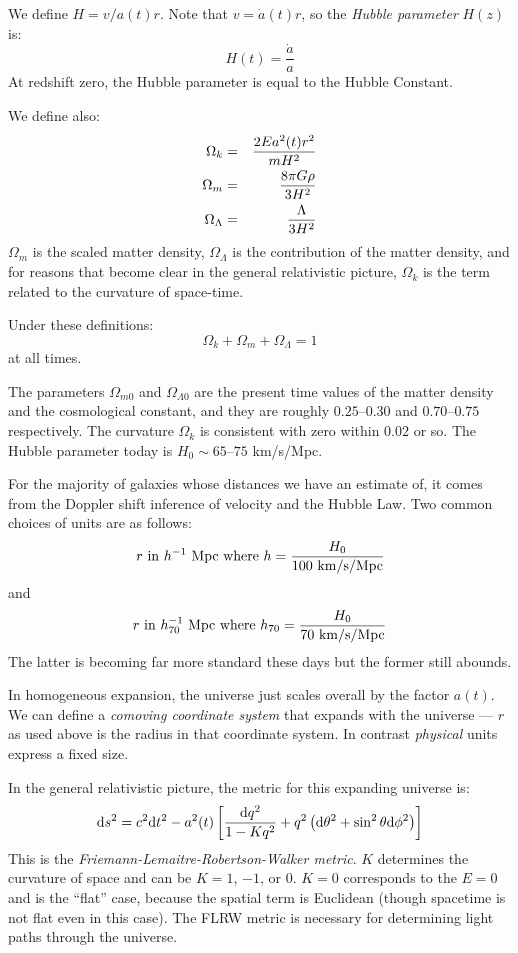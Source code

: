 We define $H=v/a(t)r$. Note that $v={\dot a}(t) r$, so the {\it Hubble
  parameter} $H(z)$ is:
\begin{equation}
  H(t) = \frac{\dot a}{a}
\end{equation}
At redshift zero, the Hubble parameter is equal to the Hubble
Constant.

We define also:
\begin{eqnarray}
\Omega_k &=& \frac{2Ea^2(t) r^2}{mH^2} \cr
\Omega_m &=& \frac{8\pi G\rho}{3H^2}\cr
\Omega_\Lambda &=& \frac{\Lambda}{3H^2} 
\end{eqnarray}
$\Omega_m$ is the scaled matter density, $\Omega_\Lambda$ is the
contribution of the matter density, and for reasons that become clear
in the general relativistic picture, $\Omega_k$ is the term related to
the curvature of space-time.

Under these definitions:
\begin{equation}
\Omega_k + \Omega_m + \Omega_\Lambda = 1
\end{equation}
at all times.
  
The parameters $\Omega_{m0}$ and $\Omega_{\Lambda 0}$ are the present
time values of the matter density and the cosmological constant, and
they are roughly $0.25$--$0.30$ and $0.70$--$0.75$ respectively.  The
curvature $\Omega_k$ is consistent with zero within $0.02$ or so.
The Hubble parameter today is $H_0 \sim 65$--$75$ km/s/Mpc. 

For the majority of galaxies whose distances we have an estimate of,
it comes from the Doppler shift inference of velocity and the Hubble
Law. Two common choices of units are as follows:
\begin{equation}
r {\rm ~in~}h^{-1}{\rm ~Mpc} {\rm ~where~} h = \frac{H_0}{100 {\rm
    ~km/s/Mpc}} 
\end{equation}
and 
\begin{equation}
r {\rm ~in~}h_{70}^{-1}{\rm ~Mpc} {\rm ~where~} h_{70} = \frac{H_0}{70
  {\rm ~km/s/Mpc}}
\end{equation}
The latter is becoming far more standard these days but the former
still abounds.

In homogeneous expansion, the universe just scales overall by the
factor $a(t)$. We can define a {\it comoving coordinate system} that
expands with the universe --- $r$ as used above is the radius in that
coordinate system. In contrast {\it physical} units express a fixed
size.

In the general relativistic picture, the metric for this expanding
universe is:
\begin{equation}
{\rm d}s^2 = c^2 {\rm d}t^2 - a^2(t) \left[ \frac{{\rm d}q^2}{1-Kq^2}
  + q^2\left({\rm d}\theta^2+ \sin^2\theta{\rm d}\phi^2\right) \right] 
\end{equation}
This is the {\it Friemann-Lemaitre-Robertson-Walker metric}.  $K$
determines the curvature of space and can be $K=1$, $-1$, or $0$.
$K=0$ corresponds to the $E=0$ and is the ``flat'' case, because the
spatial term is Euclidean (though spacetime is not flat even in this
case).  The FLRW metric is necessary for determining light paths
through the universe.

